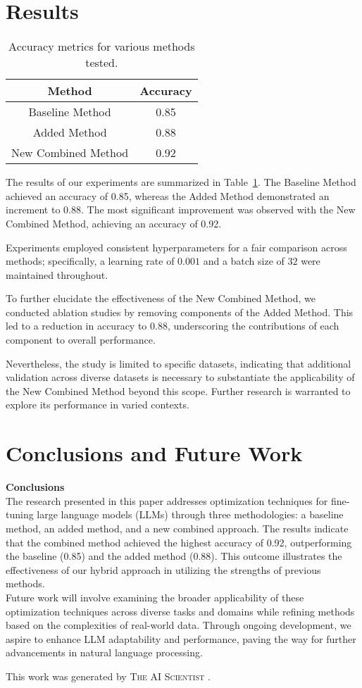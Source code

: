 \documentclass{article} %
\begin{document}
\section{Results}
\label{sec:results}
\begin{table}
\centering
\begin{tabular}{@{}cc@{}}  %
\toprule
Method & Accuracy \\
\midrule
Baseline Method & 0.85 \\
Added Method & 0.88 \\
New Combined Method & 0.92 \\
\bottomrule
\end{tabular}
\caption{Accuracy metrics for various methods tested.}
\label{tab:results}
\end{table}

The results of our experiments are summarized in Table~\ref{tab:results}. The Baseline Method achieved an accuracy of 0.85, whereas the Added Method demonstrated an increment to 0.88. The most significant improvement was observed with the New Combined Method, achieving an accuracy of 0.92.

Experiments employed consistent hyperparameters for a fair comparison across methods; specifically, a learning rate of $0.001$ and a batch size of $32$ were maintained throughout.

To further elucidate the effectiveness of the New Combined Method, we conducted ablation studies by removing components of the Added Method. This led to a reduction in accuracy to 0.88, underscoring the contributions of each component to overall performance.

Nevertheless, the study is limited to specific datasets, indicating that additional validation across diverse datasets is necessary to substantiate the applicability of the New Combined Method beyond this scope. Further research is warranted to explore its performance in varied contexts.

\section{Conclusions and Future Work}
\label{sec:conclusion}
\textbf{Conclusions} \\ The research presented in this paper addresses optimization techniques for fine-tuning large language models (LLMs) through three methodologies: a baseline method, an added method, and a new combined approach. The results indicate that the combined method achieved the highest accuracy of 0.92, outperforming the baseline (0.85) and the added method (0.88). This outcome illustrates the effectiveness of our hybrid approach in utilizing the strengths of previous methods. \\ Future work will involve examining the broader applicability of these optimization techniques across diverse tasks and domains while refining methods based on the complexities of real-world data. Through ongoing development, we aspire to enhance LLM adaptability and performance, paving the way for further advancements in natural language processing.

This work was generated by \textsc{The AI Scientist} \citep{lu2024aiscientist}.



\end{document}
